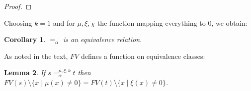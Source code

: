 \documentclass{lmcs}
\theoremstyle{theorem}\newtheorem{theorem}{Theorem}
\theoremstyle{theorem}\newtheorem{lemma}[theorem]{Lemma}
\theoremstyle{theorem}\newtheorem{corollary}[theorem]{Corollary}
\theoremstyle{definition}\newtheorem{definition}[theorem]{Definition}
\theoremstyle{definition}\newtheorem{example}[theorem]{Example}
\newcommand{\F}{\mathcal{F}}
\newcommand{\Vfree}{\mathcal{V}_{\mathit{nonb}}}
\newcommand{\Vbound}{\mathcal{V}_{\mathit{binder}}}
\newcommand{\FV}{\mathit{FV}}
\newcommand{\avar}{x}
\newcommand{\bvar}{y}
\newcommand{\cvar}{z}
\newcommand{\abs}[2]{\lambda #1.#2}
\newcommand{\meta}[2]{#1\langle#2\rangle}
\newcommand{\tuple}[2]{\llparenthesis #1,\dots,#2 \rrparenthesis}
\begin{document}
\begin{proof}
\end{proof}

Choosing $k = 1$ and for $\mu,\xi,\chi$ the function mapping everything to $0$,
we obtain:

\begin{corollary}\label{corr:alphaequiv}
$=_\alpha$ is an equivalence relation.
\end{corollary}

As noted in the text, $\FV$ defines a function on equivalence classes:

\begin{lemma}\label{lem:alphafreevar}
If $s =_\alpha^{\mu,\xi,k} t$ then $\FV(s) \setminus \{ x \mid \mu(x) \neq 0 \} = \FV(t) \setminus \{ x \mid \xi(x) \neq 0 \}$.
\end{lemma}
\end{document}
